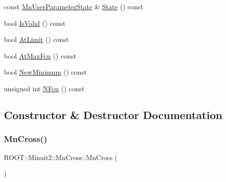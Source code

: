 \begin{DoxyCompactItemize}
\item 
const \mbox{\hyperlink{classROOT_1_1Minuit2_1_1MnUserParameterState}{Mn\+User\+Parameter\+State}} \& \mbox{\hyperlink{classROOT_1_1Minuit2_1_1MnCross_a97ba8e698ee948a842f0ebe198c0d528}{State}} () const
\item 
bool \mbox{\hyperlink{classROOT_1_1Minuit2_1_1MnCross_a9cee17151ec7e078fc6efbfa32120a1a}{Is\+Valid}} () const
\item 
bool \mbox{\hyperlink{classROOT_1_1Minuit2_1_1MnCross_a01119708c6c9aa2a5b16222705cad954}{At\+Limit}} () const
\item 
bool \mbox{\hyperlink{classROOT_1_1Minuit2_1_1MnCross_a785c82249ecae395a16536cfc64aa610}{At\+Max\+Fcn}} () const
\item 
bool \mbox{\hyperlink{classROOT_1_1Minuit2_1_1MnCross_aaf90f3645fb5fcc67b49ffd24f4a12ba}{New\+Minimum}} () const
\item 
unsigned int \mbox{\hyperlink{classROOT_1_1Minuit2_1_1MnCross_a52cc0559ea27a2d8fe3f9961670e1544}{N\+Fcn}} () const
\end{DoxyCompactItemize}


\subsection{Constructor \& Destructor Documentation}
\mbox{\label{classROOT_1_1Minuit2_1_1MnCross_a34d52c2c171319eb9f25c688ab8021f0}} 
\subsubsection{\texorpdfstring{MnCross()}{MnCross()}\hspace{0.1cm}{\footnotesize\ttfamily [1/24]}}
{\footnotesize\ttfamily R\+O\+O\+T\+::\+Minuit2\+::\+Mn\+Cross\+::\+Mn\+Cross (\begin{DoxyParamCaption}{ }\end{DoxyParamCaption})\hspace{0.3cm}{\ttfamily [inline]}}

\mbox{\label{classROOT_1_1Minuit2_1_1MnCross_a7f93187035c85b5c2adf78d00c0d0052}} 

